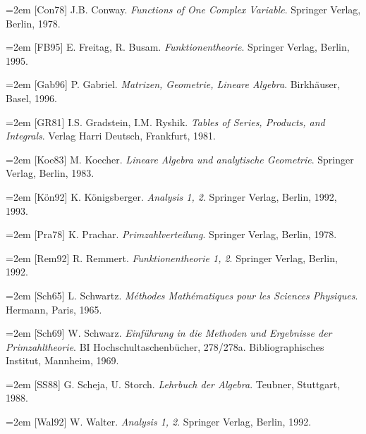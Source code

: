 \par\hangindent=2em [Con78] J.B. Conway. \emph{Functions of One Complex Variable}. Springer Verlag, Berlin, 1978.\par

\par\hangindent=2em [FB95] E. Freitag, R. Busam. \emph{Funktionentheorie}. Springer Verlag, Berlin, 1995.\par

\par\hangindent=2em [Gab96] P. Gabriel. \emph{Matrizen, Geometrie, Lineare Algebra}. Birkhäuser, Basel, 1996.\par

\par\hangindent=2em [GR81] I.S. Gradstein, I.M. Ryshik. \emph{Tables of Series, Products, and Integrals}. Verlag Harri Deutsch, Frankfurt, 1981.\par

\par\hangindent=2em [Koe83] M. Koecher. \emph{Lineare Algebra und analytische Geometrie}. Springer Verlag, Berlin, 1983.\par

\par\hangindent=2em [Kön92] K. Königsberger. \emph{Analysis 1, 2}. Springer Verlag, Berlin, 1992, 1993.\par

\par\hangindent=2em [Pra78] K. Prachar. \emph{Primzahlverteilung}. Springer Verlag, Berlin, 1978.\par

\par\hangindent=2em [Rem92] R. Remmert. \emph{Funktionentheorie 1, 2}. Springer Verlag, Berlin, 1992.\par

\par\hangindent=2em [Sch65] L. Schwartz. \emph{Méthodes Mathématiques pour les Sciences Physiques}. Hermann, Paris, 1965.\par

\par\hangindent=2em [Sch69] W. Schwarz. \emph{Einführung in die Methoden und Ergebnisse der Primzahltheorie}. BI Hochschultaschenbücher, 278/278a. Bibliographisches Institut, Mannheim, 1969.\par

\par\hangindent=2em [SS88] G. Scheja, U. Storch. \emph{Lehrbuch der Algebra}. Teubner, Stuttgart, 1988.\par

\par\hangindent=2em [Wal92] W. Walter. \emph{Analysis 1, 2}. Springer Verlag, Berlin, 1992.\par
\endgroup
